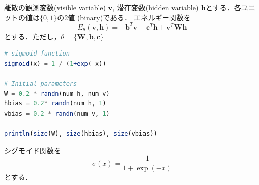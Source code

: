 離散の観測変数(visible variable) $\mathbf{v}$, 潜在変数(hidden variable) $\mathbf{h}$とする．各ユニットの値は$\{0, 1\}$の2値 (binary)である．
エネルギー関数を
\begin{equation}
E_\theta(\mathbf{v}, \mathbf{h})=-\mathbf{b}^T \mathbf{v} - \mathbf{c}^T \mathbf{h} + \mathbf{v}^T \mathbf{W} \mathbf{h}
\end{equation}
とする．ただし，$\theta=\{\mathbf{W}, \mathbf{b}, \mathbf{c}\}$
\begin{lstlisting}[language=julia]
# sigmoid function 
sigmoid(x) = 1 / (1+exp(-x))

# Initial parameters
W = 0.2 * randn(num_h, num_v)
hbias = 0.2* randn(num_h, 1)
vbias = 0.2 * randn(num_v, 1)

println(size(W), size(hbias), size(vbias))
\end{lstlisting}
シグモイド関数を
\begin{equation}
\sigma(x) = \frac{1}{1+\exp(-x)}
\end{equation}
とする．
